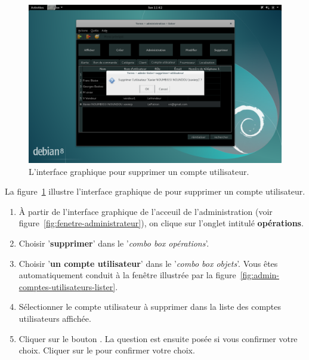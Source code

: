 
\newpage
{}

\begin{figure}[!htpb]
	\centering
	\includegraphics[scale=0.39]{images/compte-utilisateur-supprimer.png}
	\caption{L'interface graphique pour supprimer un compte utilisateur.}
	\label{fig:admin-comptes-utilisateurs-supprimer}
\end{figure}

La figure~\ref{fig:admin-comptes-utilisateurs-supprimer}
illustre l'interface graphique de \yeroth pour supprimer
un compte utilisateur.

\begin{enumerate}[1)]
	\item \`A partir de l'interface graphique de l'acceuil de
		l'administration (voir figure~\ref{fig:fenetre-administrateur}),
		on clique sur l'onglet intitul\'e \textbf{op\'erations}. 
		
	\item Choisir '\textbf{supprimer}' dans le '\emph{combo box
		op\'erations}'.
		
	\item Choisir '\textbf{un compte utilisateur}' dans le
		'\emph{combo box objets}'. Vous \^etes automatiquement
		conduit \`a la fen\^etre illustr\'ee par la
		figure~\ref{fig:admin-comptes-utilisateurs-lister}.
		
	\item S\'electionner le compte utilisateur \`a supprimer
		dans la liste des comptes utilisateurs affich\'ee.
		
	\item Cliquer sur le bouton . La question
		est ensuite pos\'ee si vous confirmer votre choix.
		Cliquer sur le  pour confirmer votre choix.
\end{enumerate}
